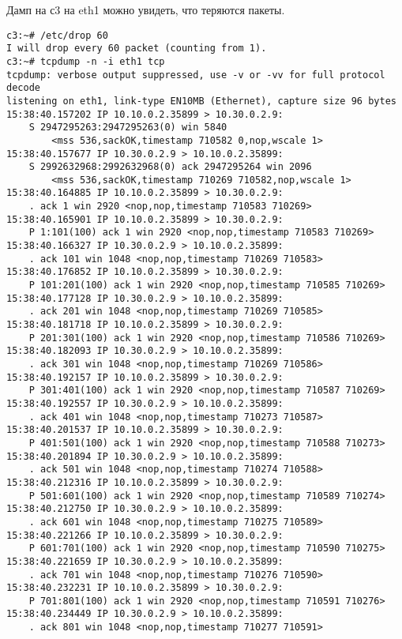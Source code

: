\documentclass[a4paper,12pt]{article}
\begin{document}
Дамп на с3 на eth1 можно увидеть, что теряются пакеты.

\begin{Verbatim}
c3:~# /etc/drop 60
I will drop every 60 packet (counting from 1).
c3:~# tcpdump -n -i eth1 tcp
tcpdump: verbose output suppressed, use -v or -vv for full protocol decode
listening on eth1, link-type EN10MB (Ethernet), capture size 96 bytes
15:38:40.157202 IP 10.10.0.2.35899 > 10.30.0.2.9: 
    S 2947295263:2947295263(0) win 5840 
        <mss 536,sackOK,timestamp 710582 0,nop,wscale 1>
15:38:40.157677 IP 10.30.0.2.9 > 10.10.0.2.35899: 
    S 2992632968:2992632968(0) ack 2947295264 win 2096 
        <mss 536,sackOK,timestamp 710269 710582,nop,wscale 1>
15:38:40.164885 IP 10.10.0.2.35899 > 10.30.0.2.9: 
    . ack 1 win 2920 <nop,nop,timestamp 710583 710269>
15:38:40.165901 IP 10.10.0.2.35899 > 10.30.0.2.9: 
    P 1:101(100) ack 1 win 2920 <nop,nop,timestamp 710583 710269>
15:38:40.166327 IP 10.30.0.2.9 > 10.10.0.2.35899: 
    . ack 101 win 1048 <nop,nop,timestamp 710269 710583>
15:38:40.176852 IP 10.10.0.2.35899 > 10.30.0.2.9: 
    P 101:201(100) ack 1 win 2920 <nop,nop,timestamp 710585 710269>
15:38:40.177128 IP 10.30.0.2.9 > 10.10.0.2.35899: 
    . ack 201 win 1048 <nop,nop,timestamp 710269 710585>
15:38:40.181718 IP 10.10.0.2.35899 > 10.30.0.2.9: 
    P 201:301(100) ack 1 win 2920 <nop,nop,timestamp 710586 710269>
15:38:40.182093 IP 10.30.0.2.9 > 10.10.0.2.35899: 
    . ack 301 win 1048 <nop,nop,timestamp 710269 710586>
15:38:40.192157 IP 10.10.0.2.35899 > 10.30.0.2.9: 
    P 301:401(100) ack 1 win 2920 <nop,nop,timestamp 710587 710269>
15:38:40.192557 IP 10.30.0.2.9 > 10.10.0.2.35899: 
    . ack 401 win 1048 <nop,nop,timestamp 710273 710587>
15:38:40.201537 IP 10.10.0.2.35899 > 10.30.0.2.9: 
    P 401:501(100) ack 1 win 2920 <nop,nop,timestamp 710588 710273>
15:38:40.201894 IP 10.30.0.2.9 > 10.10.0.2.35899: 
    . ack 501 win 1048 <nop,nop,timestamp 710274 710588>
15:38:40.212316 IP 10.10.0.2.35899 > 10.30.0.2.9: 
    P 501:601(100) ack 1 win 2920 <nop,nop,timestamp 710589 710274>
15:38:40.212750 IP 10.30.0.2.9 > 10.10.0.2.35899: 
    . ack 601 win 1048 <nop,nop,timestamp 710275 710589>
15:38:40.221266 IP 10.10.0.2.35899 > 10.30.0.2.9: 
    P 601:701(100) ack 1 win 2920 <nop,nop,timestamp 710590 710275>
15:38:40.221659 IP 10.30.0.2.9 > 10.10.0.2.35899: 
    . ack 701 win 1048 <nop,nop,timestamp 710276 710590>
15:38:40.232231 IP 10.10.0.2.35899 > 10.30.0.2.9: 
    P 701:801(100) ack 1 win 2920 <nop,nop,timestamp 710591 710276>
15:38:40.234449 IP 10.30.0.2.9 > 10.10.0.2.35899: 
    . ack 801 win 1048 <nop,nop,timestamp 710277 710591>

\end{Verbatim}
\end{document}
